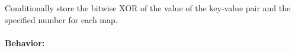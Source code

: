 Conditionally store the bitwise XOR of the value of the key-value pair and the
specified number for each map.

\paragraph{Behavior:}
\begin{itemize}[noitemsep]



\end{itemize}
